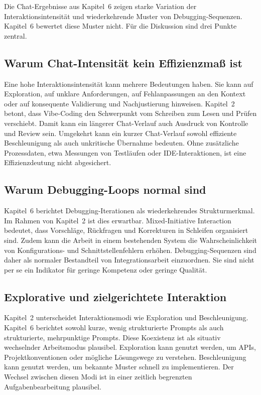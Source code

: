 Die Chat-Ergebnisse aus Kapitel~6 zeigen starke Variation der Interaktionsintensität und wiederkehrende Muster von Debugging-Sequenzen.
Kapitel~6 bewertet diese Muster nicht.
Für die Diskussion sind drei Punkte zentral.

\subsection{Warum Chat-Intensität kein Effizienzmaß ist}
\label{sec:discussion_chat_intensity}

Eine hohe Interaktionsintensität kann mehrere Bedeutungen haben.
Sie kann auf Exploration, auf unklare Anforderungen, auf Fehlanpassungen an den Kontext oder auf konsequente Validierung und Nachjustierung hinweisen.
Kapitel~2 betont, dass Vibe-Coding den Schwerpunkt vom Schreiben zum Lesen und Prüfen verschiebt.
Damit kann ein längerer Chat-Verlauf auch Ausdruck von Kontrolle und Review sein.
Umgekehrt kann ein kurzer Chat-Verlauf sowohl effiziente Beschleunigung als auch unkritische Übernahme bedeuten.
Ohne zusätzliche Prozessdaten, etwa Messungen von Testläufen oder IDE-Interaktionen, ist eine Effizienzdeutung nicht abgesichert.

\subsection{Warum Debugging-Loops normal sind}
\label{sec:discussion_debugging_loops}

Kapitel~6 berichtet Debugging-Iterationen als wiederkehrendes Strukturmerkmal.
Im Rahmen von Kapitel~2 ist dies erwartbar.
Mixed-Initiative Interaction bedeutet, dass Vorschläge, Rückfragen und Korrekturen in Schleifen organisiert sind.
Zudem kann die Arbeit in einem bestehenden System die Wahrscheinlichkeit von Konfigurations- und Schnittstellenfehlern erhöhen.
Debugging-Sequenzen sind daher als normaler Bestandteil von Integrationsarbeit einzuordnen.
Sie sind nicht per se ein Indikator für geringe Kompetenz oder geringe Qualität.

\subsection{Explorative und zielgerichtete Interaktion}
\label{sec:discussion_exploration_vs_acceleration}

Kapitel~2 unterscheidet Interaktionsmodi wie Exploration und Beschleunigung.
Kapitel~6 berichtet sowohl kurze, wenig strukturierte Prompts als auch strukturierte, mehrpunktige Prompts.
Diese Koexistenz ist als situativ wechselnder Arbeitsmodus plausibel.
Exploration kann genutzt werden, um APIs, Projektkonventionen oder mögliche Lösungswege zu verstehen.
Beschleunigung kann genutzt werden, um bekannte Muster schnell zu implementieren.
Der Wechsel zwischen diesen Modi ist in einer zeitlich begrenzten Aufgabenbearbeitung plausibel.


